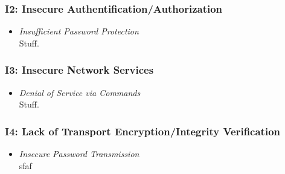         \subsubsection*{I2: Insecure Authentification/Authorization}
            \begin{itemize}[leftmargin=0cm,label={}]
                \item \emph{Insufficient Password Protection}\label{vuln:prototype_pwdprot}\\
        	        Stuff.
            \end{itemize}
            
        \subsubsection*{I3: Insecure Network Services}
            \begin{itemize}[leftmargin=0cm,label={}]
                \item \emph{Denial of Service via Commands}\label{vuln:prototype_doscmd}\\
        	        Stuff.
            \end{itemize}
            
        \subsubsection*{I4: Lack of Transport Encryption/Integrity Verification}
            \begin{itemize}[leftmargin=0cm,label={}]
                \item \emph{Insecure Password Transmission}\label{vuln:prototype_pwdtrns}\\
                    sfaf
            \end{itemize}
            
